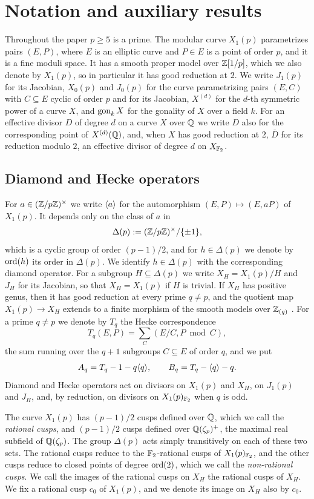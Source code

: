\section{Notation and auxiliary results}\label{sec:notation}

Throughout the paper $p\geq 5$ is a prime. The modular curve $X_1(p)$ parametrizes pairs $(E,P)$, where $E$ is an elliptic curve and $P\in E$ is a point of order $p$, and it is a fine moduli space. It has a smooth proper model over $\mathbb{Z}[1/p]$, which we also denote by $X_1(p)$, so in particular it has good reduction at $2$. We write $J_1(p)$ for its Jacobian, $X_0(p)$ and $J_0(p)$ for the curve parametrizing pairs $(E,C)$ with $C\subseteq E$ cyclic of order $p$ and for its Jacobian, $X^{(d)}$ for the $d$-th symmetric power of a curve $X$, and $\operatorname{gon}_k X$ for the gonality of $X$ over a field $k$. For an effective divisor $D$ of degree $d$ on a curve $X$ over $\mathbb{Q}$ we write $D$ also for the corresponding point of $X^{(d)}(\mathbb{Q})$, and, when $X$ has good reduction at $2$, $\overline D$ for its reduction modulo $2$, an effective divisor of degree $d$ on $X_{\mathbb{F}_2}$.

\subsection{Diamond and Hecke operators}
For $a\in(\mathbb{Z}/p\mathbb{Z})^\times$ we write $\langle a\rangle$ for the automorphism $(E,P)\mapsto(E,aP)$ of $X_1(p)$. It depends only on the class of $a$ in
$$\Delta(p):=(\mathbb{Z}/p\mathbb{Z})^\times/\{\pm1\},$$
which is a cyclic group of order $(p-1)/2$, and for $h\in\Delta(p)$ we denote by $\operatorname{ord}(h)$ its order in $\Delta(p)$. We identify $h\in\Delta(p)$ with the corresponding diamond operator. For a subgroup $H\subseteq\Delta(p)$ we write $X_H=X_1(p)/H$ and $J_H$ for its Jacobian, so that $X_H=X_1(p)$ if $H$ is trivial. If $X_H$ has positive genus, then it has good reduction at every prime $q\neq p$, and the quotient map $X_1(p)\to X_H$ extends to a finite morphism of the smooth models over $\mathbb{Z}_{(q)}$ \cite[Corollary 4.10]{LL}. For a prime $q\neq p$ we denote by $T_q$ the Hecke correspondence
$$T_q(E,P)=\sum_{C}(E/C,P\bmod C),$$
the sum running over the $q+1$ subgroups $C\subseteq E$ of order $q$, and we put
$$A_q=T_q-1-q\langle q\rangle,\qquad B_q=T_q-\langle q\rangle-q.$$
Diamond and Hecke operators act on divisors on $X_1(p)$ and $X_H$, on $J_1(p)$ and $J_H$, and, by reduction, on divisors on $X_1(p)_{\mathbb{F}_2}$ when $q$ is odd.

The curve $X_1(p)$ has $(p-1)/2$ cusps defined over $\mathbb{Q}$, which we call the \textit{rational cusps}, and $(p-1)/2$ cusps defined over $\mathbb{Q}(\zeta_p)^+$, the maximal real subfield of $\mathbb{Q}(\zeta_p)$. The group $\Delta(p)$ acts simply transitively on each of these two sets. The rational cusps reduce to the $\mathbb{F}_2$-rational cusps of $X_1(p)_{\mathbb{F}_2}$, and the other cusps reduce to closed points of degree $\operatorname{ord}(2)$, which we call the \textit{non-rational cusps}. We call the images of the rational cusps on $X_H$ the rational cusps of $X_H$. We fix a rational cusp $c_0$ of $X_1(p)$, and we denote its image on $X_H$ also by $c_0$.

